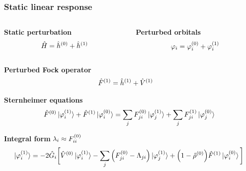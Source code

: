 
\begin{frame}
    \frametitle{Static linear response}
    \begin{columns}
    \begin{column}[b]{0.5\linewidth}
    \centering
    \textbf{Static perturbation}
    \begin{equation}
        \nonumber
        \hat{H} = \hat{h}^{(0)} + \hat{h}^{(1)}
    \end{equation}
    \end{column}

    \begin{column}[b]{0.5\linewidth}
    \centering
    \textbf{Perturbed orbitals}
    \begin{equation}
        \nonumber
        \varphi_i = \varphi_i^{(0)} + \varphi_i^{(1)}
    \end{equation}
    \end{column}
    \end{columns}

    \vspace{5mm}

    \centering
    \textbf{Perturbed Fock operator}
    \begin{align}
        \nonumber
        \hat{F}^{(1)} &= \hat{h}^{(1)} + \hat{V}^{(1)}
    \end{align}

    \vspace{5mm}

    \centering
    \textbf{Sternheimer equations}
    \begin{equation}
        \nonumber
        \hat{F}^{(0)}\ket{\varphi_i^{(1)}} +
        \hat{F}^{(1)}\ket{\varphi_i^{(0)}} =
        \sum_j F_{ji}^{(0)}\ket{\varphi_j^{(1)}} + 
        \sum_j F_{ji}^{(1)}\ket{\varphi_j^{(0)}}
    \end{equation}

    \vspace{5mm}

    \centering
    \textbf{Integral form} $\lambda_{i} \approx F^{(0)}_{ii}$
    \begin{equation}
        \nonumber
        \ket{\varphi_i^{(1)}} = -2\hat{G}_i\bigg[
        \hat{V}^{(0)}\ket{\varphi_i^{(1)}} -
        \sum_j \Big(F^{(0)}_{ji} - \Lambda_{ji}\Big)
        \ket{\varphi_j^{(1)}} +
        \Big(1 - \hat{\rho}^{(0)}\Big)
        \hat{F}^{(1)}\ket{\varphi_i^{(0)}}
        \bigg]
    \end{equation}
\end{frame}

